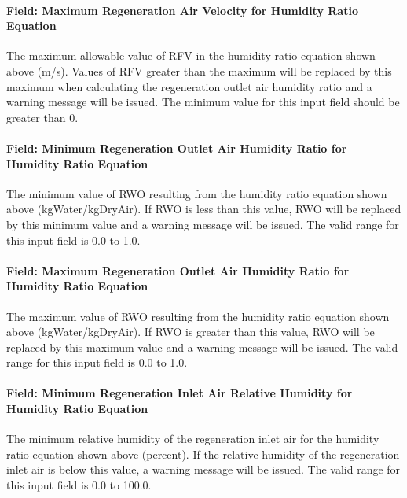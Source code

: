 \paragraph{Field: Maximum Regeneration Air Velocity for Humidity Ratio Equation}\label{field-maximum-regeneration-air-velocity-for-humidity-ratio-equation}

The maximum allowable value of RFV in the humidity ratio equation shown above (m/s). Values of RFV greater than the maximum will be replaced by this maximum when calculating the regeneration outlet air humidity ratio and a warning message will be issued. The minimum value for this input field should be greater than 0.

\paragraph{Field: Minimum Regeneration Outlet Air Humidity Ratio for Humidity Ratio Equation}\label{field-minimum-regeneration-outlet-air-humidity-ratio-for-humidity-ratio-equation}

The minimum value of RWO resulting from the humidity ratio equation shown above (kgWater/kgDryAir). If RWO is less than this value, RWO will be replaced by this minimum value and a warning message will be issued. The valid range for this input field is 0.0 to 1.0.

\paragraph{Field: Maximum Regeneration Outlet Air Humidity Ratio for Humidity Ratio Equation}\label{field-maximum-regeneration-outlet-air-humidity-ratio-for-humidity-ratio-equation}

The maximum value of RWO resulting from the humidity ratio equation shown above (kgWater/kgDryAir). If RWO is greater than this value, RWO will be replaced by this maximum value and a warning message will be issued. The valid range for this input field is 0.0 to 1.0.

\paragraph{Field: Minimum Regeneration Inlet Air Relative Humidity for Humidity Ratio Equation}\label{field-minimum-regeneration-inlet-air-relative-humidity-for-humidity-ratio-equation}

The minimum relative humidity of the regeneration inlet air for the humidity ratio equation shown above (percent). If the relative humidity of the regeneration inlet air is below this value, a warning message will be issued. The valid range for this input field is 0.0 to 100.0.

